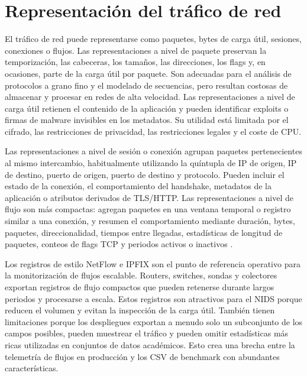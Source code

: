 \section{Representación del tráfico de red}

El tráfico de red puede representarse como paquetes, bytes de carga útil, sesiones, conexiones o flujos. Las representaciones a nivel de paquete preservan la temporización, las cabeceras, los tamaños, las direcciones, los flags y, en ocasiones, parte de la carga útil por paquete. Son adecuadas para el análisis de protocolos a grano fino y el modelado de secuencias, pero resultan costosas de almacenar y procesar en redes de alta velocidad. Las representaciones a nivel de carga útil retienen el contenido de la aplicación y pueden identificar exploits o firmas de malware invisibles en los metadatos. Su utilidad está limitada por el cifrado, las restricciones de privacidad, las restricciones legales y el coste de CPU.

Las representaciones a nivel de sesión o conexión agrupan paquetes pertenecientes al mismo intercambio, habitualmente utilizando la quíntupla de IP de origen, IP de destino, puerto de origen, puerto de destino y protocolo. Pueden incluir el estado de la conexión, el comportamiento del handshake, metadatos de la aplicación o atributos derivados de TLS/HTTP. Las representaciones a nivel de flujo son más compactas: agregan paquetes en una ventana temporal o registro similar a una conexión, y resumen el comportamiento mediante duración, bytes, paquetes, direccionalidad, tiempos entre llegadas, estadísticas de longitud de paquetes, conteos de flags TCP y periodos activos o inactivos \parencite{Sperotto2010FlowIDS,Umer2017FlowIDS}.

Los registros de estilo NetFlow e IPFIX son el punto de referencia operativo para la monitorización de flujos escalable. Routers, switches, sondas y colectores exportan registros de flujo compactos que pueden retenerse durante largos periodos y procesarse a escala. Estos registros son atractivos para el NIDS porque reducen el volumen y evitan la inspección de la carga útil. También tienen limitaciones porque los despliegues exportan a menudo solo un subconjunto de los campos posibles, pueden muestrear el tráfico y pueden omitir estadísticas más ricas utilizadas en conjuntos de datos académicos. Esto crea una brecha entre la telemetría de flujos en producción y los CSV de benchmark con abundantes características.

